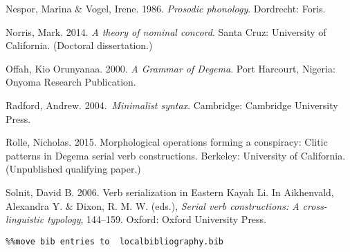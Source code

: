 \begin{styleNoSpacing}
Nespor, Marina \& Vogel, Irene. 1986. \textit{Prosodic phonology}. Dordrecht: Foris.
\end{styleNoSpacing}

\begin{styleNoSpacing}
Norris, Mark. 2014. \textit{A theory of nominal concord}. Santa Cruz: University of California. (Doctoral dissertation.)
\end{styleNoSpacing}

\begin{styleNoSpacing}
Offah, Kio Orunyanaa. 2000. \textit{A Grammar of Degema}. Port Harcourt, Nigeria: Onyoma Research Publication.
\end{styleNoSpacing}

\begin{styleNoSpacing}
Radford, Andrew. 2004.{~}\textit{Minimalist syntax}. Cambridge: Cambridge University Press.
\end{styleNoSpacing}

\begin{styleNoSpacing}
Rolle, Nicholas. 2015. Morphological operations forming a conspiracy: Clitic patterns in Degema serial verb constructions. Berkeley: University of California. (Unpublished qualifying paper.)
\end{styleNoSpacing}

\begin{styleNoSpacing}
Solnit, David B. 2006. Verb serialization in Eastern Kayah Li. In Aikhenvald, Alexandra Y. \& Dixon, R. M. W. (eds.), \textit{Serial verb constructions: A cross-linguistic typology}, 144–159. Oxford: Oxford University Press.
\end{styleNoSpacing}


\begin{verbatim}%%move bib entries to  localbibliography.bib
\end{verbatim}